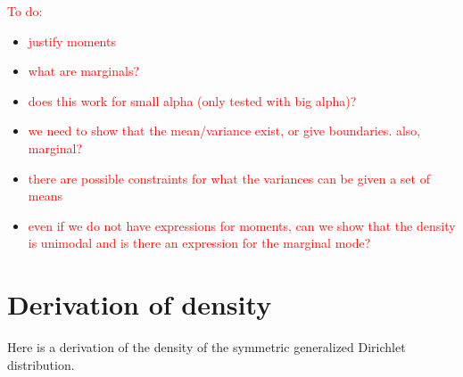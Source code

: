\documentclass[ba]{imsart}
\numberwithin{equation}{section}
\theoremstyle{plain}
\newcommand{\falta}[1]{\textcolor{red}{#1}}
\begin{document}
\falta{To do:}
\begin{itemize}
\item \falta{justify moments} 
\item \falta{what are marginals?} 
\item \falta{does this work for small alpha (only tested with big
    alpha)?}
\item \falta{we need to show that the mean/variance exist, or give
    boundaries. also, marginal?}
\item \falta{there are possible constraints for what the variances can
    be given a set of means}
\item \falta{even if we do not have expressions for moments, can we
    show that the density is unimodal and is there an expression for
    the marginal mode?}
\end{itemize}

\appendix
\section{Derivation of density}

Here is a derivation of the density of the symmetric generalized Dirichlet distribution.
\end{document}
